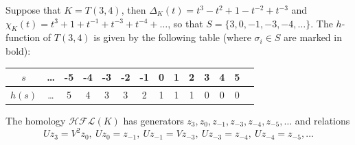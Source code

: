 \documentclass{amsart}
\newtheorem{example}[theorem]{Example}
\newcommand{\cHFL}{\mathcal{H\!F\! L}}
\newcommand{\HFK}{\mathit{HFK}}
\newcommand{\EG}[1]{{\color{red}#1}}
\begin{document}
Suppose that $K=T(3,4)$, then $\Delta_{K}(t)=t^3-t^2+1-t^{-2}+t^{-3}$ and $\chi_K(t)=t^3+1+t^{-1}+t^{-3}+t^{-4}+\ldots$, so 
that $S=\{3,0,-1,-3,-4,\ldots\}$. 
The $h$-function of $T(3,4)$ is given by the following table (where $\sigma_i\in S$ are marked in bold):
\begin{center}
\begin{tabular}{|c|c|c|c|c|c|c|c|c|c|c|c|c|c|}
\hline
$s$ & \dots & \bf{-5} & \bf{-4} & \bf{-3} & -2 & \bf{-1} & \bf{0} & 1 & 2 & \bf{3} & 4 & 5\\
\hline
$h(s)$ & \dots & 5 & 4 & 3 & 3 & 2 & 1 & 1 & 1 & 0 & 0 & 0\\
\hline
\end{tabular}
\end{center}
The homology $\cHFL(K)$ has generators $z_{3},z_0,z_{-1},z_{-3},z_{-4},z_{-5},\ldots$ and relations
\begin{equation}
\label{eq: T34 relations}
Uz_3=V^2z_0,\ Uz_0=z_{-1},\ Uz_{-1}=Vz_{-3},\ Uz_{-3}=z_{-4},\ Uz_{-4}=z_{-5},\ldots
\end{equation}
\end{document}
